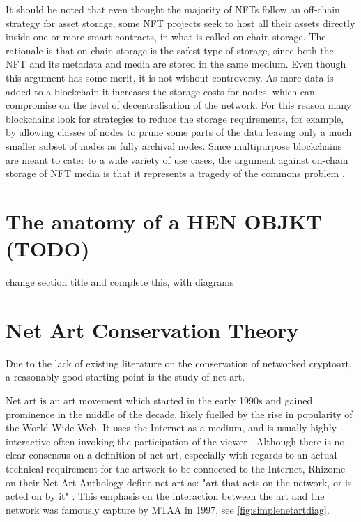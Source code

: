 It should be noted that even thought the majority of NFTs follow an off-chain strategy for asset storage, some NFT projects seek to host all their assets directly inside one or more smart contracts, in what is called on-chain storage. The rationale is that on-chain storage is the safest type of storage, since both the NFT and its metadata and media are stored in the same medium. Even though this argument has some merit, it is not without controversy. As more data is added to a blockchain it increases the storage costs for nodes, which can compromise on the level of decentralisation of the network. For this reason many blockchains look for strategies to reduce the storage requirements, for example, by allowing classes of nodes to prune some parts of the data leaving only a much smaller subset of nodes as fully archival nodes. Since multipurpose blockchains are meant to cater to a wide variety of use cases, the argument against on-chain storage of NFT media is that it represents a tragedy of the commons problem \needcite .


\section{The anatomy of a HEN OBJKT (TODO)}

\todo change section title and complete this, with diagrams


\section{Net Art Conservation Theory}

Due to the lack of existing literature on the conservation of networked cryptoart, a reasonably good starting point is the study of net art.

Net art is an art movement which started in the early 1990s and gained prominence in the middle of the decade, likely fuelled by the rise in popularity of the World Wide Web. It uses the Internet as a medium, and is usually highly interactive often invoking the participation of the viewer \cite{kholeifInternet_ArtBirthWeb2023}. Although there is no clear consensus on a definition of net art, especially with regards to an actual technical requirement for the artwork to be connected to the Internet, Rhizome on their Net Art Anthology define net art as: "art that acts on the network, or is acted on by it" \cite{WhatNetArt2017}.
This emphasis on the interaction between the art and the network was famously capture by MTAA in 1997, see \autoref{fig:simplenetartdiag}.

